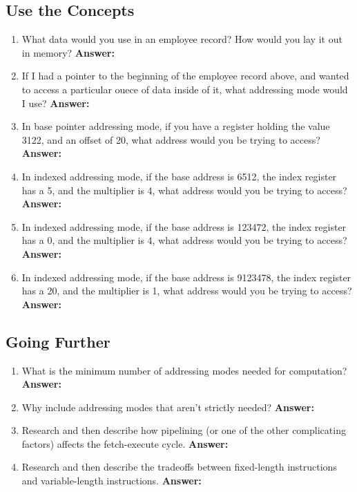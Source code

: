 \documentclass[12pt]{article}
\begin{document}
\subsection*{Use the Concepts}
\begin{enumerate}
    \item What data would you use in an employee record? How would you lay it out in memory?
        \textbf{Answer:}
    \item If I had a pointer to the beginning of the employee record above, and wanted to access a particular ouece of data inside of it, what addressing mode would I use?
        \textbf{Answer:}
    \item In base pointer addressing mode, if you have a register holding the value 3122, and an offset of 20, what address would you be trying to access?
        \textbf{Answer:}
    \item In indexed addressing mode, if the base address is 6512, the index register has a 5, and the multiplier is 4, what address would you be trying to access?
        \textbf{Answer:}
    \item In indexed addressing mode, if the base address is 123472, the index register has a 0, and the multiplier is 4, what address would you be trying to access?
        \textbf{Answer:}
    \item In indexed addressing mode, if the base address is 9123478, the index register has a 20, and the multiplier is 1, what address would you be trying to access?
        \textbf{Answer:}
\end{enumerate}

\subsection*{Going Further}
\begin{enumerate}
    \item What is the minimum number of addressing modes needed for computation?
        \textbf{Answer:}
    \item Why include addressing modes that aren't strictly needed?
        \textbf{Answer:}
    \item Research and then describe how pipelining (or one of the other complicating factors) affects the fetch-execute cycle.
        \textbf{Answer:}
    \item Research and then describe the tradeoffs between fixed-length instructions and variable-length instructions.
        \textbf{Answer:}
\end{enumerate}
\end{document}
